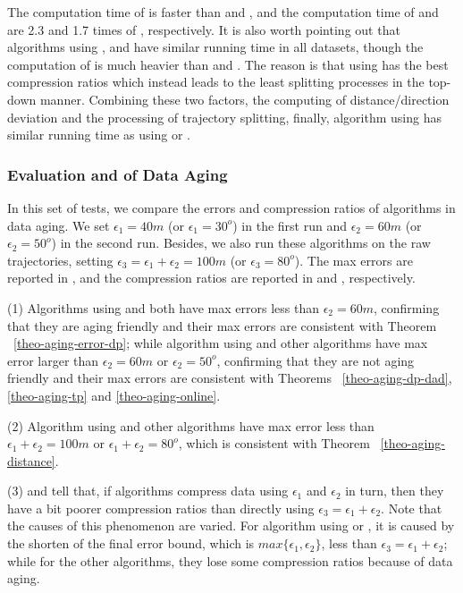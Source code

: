 {
The computation time of \dad is faster than \ped and \sed, and the computation time of \ped and \sed are 2.3 and 1.7 times of \dad, respectively.
{It is also worth pointing out that algorithms \dpa using \ped, \sed and \dad have similar running time in all datasets, though the computation of \ped is much heavier than \sed and \dad. The reason is that \dpa using \ped has the best compression ratios which instead leads to the least splitting processes in the top-down manner. Combining these two factors, \ie the computing of distance/direction deviation and the processing of trajectory splitting, finally, algorithm \dpa using \ped has similar running time as \dpa using \dad or \sed.}

\subsubsection{{Evaluation and  of Data Aging}}
\label{sec:exp-data-aging}
In this set of tests, we compare the errors and compression ratios of algorithms in data aging. We set $\epsilon_1=40m$ (or $\epsilon_1=30^o$) in the first run and $\epsilon_2=60m$ (or $\epsilon_2=50^o$) in the second run. Besides, we also run these algorithms on the raw trajectories, setting $\epsilon_3=\epsilon_1 + \epsilon_2=100m$ (or $\epsilon_3=80^o$). The max errors are reported in , and the compression ratios are reported in  and , respectively.

\ni (1) Algorithms \dpa using \ped and \sed both have max errors less than $\epsilon_2 = 60m$, confirming that they are aging friendly and their max errors are consistent with Theorem ~\ref{theo-aging-error-dp}; while algorithm \dpa using \dad and other algorithms have max error larger than $\epsilon_2 = 60m$ or $\epsilon_2 = 50^o$, confirming that they are not aging friendly and their max errors are consistent with Theorems ~\ref{theo-aging-dp-dad}, \ref{theo-aging-tp} and \ref{theo-aging-online}.

\ni (2) Algorithm \dpa using \dad and other algorithms have max error less than $\epsilon_1 + \epsilon_2 = 100m$ or $\epsilon_1 + \epsilon_2 = 80^o$, which is consistent with Theorem ~\ref{theo-aging-distance}.

\ni (3)  and  tell that, if algorithms compress data using $\epsilon_1$ and $\epsilon_2$ in turn, then they have a bit poorer compression ratios than directly using $\epsilon_3=\epsilon_1 + \epsilon_2$.
Note that the causes of this phenomenon are varied. For algorithm \dpa using \ped or \sed, it is caused by the shorten of the final error bound, which is $max\{\epsilon_1, \epsilon_2\}$, less than $\epsilon_3=\epsilon_1 + \epsilon_2$; while for the other algorithms, they lose some compression ratios because of data aging.


}
